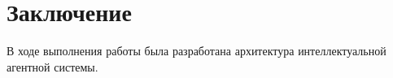 
\newpage
\section*{Заключение}

В ходе выполнения работы была разработана архитектура интеллектуальной агентной системы.
